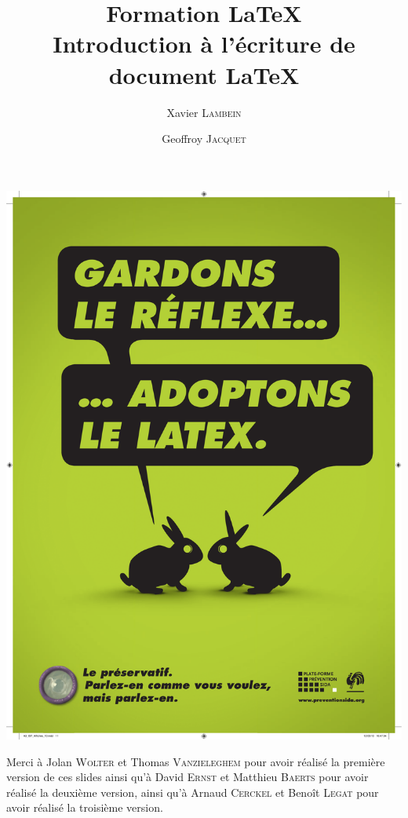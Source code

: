 \documentclass[10pt,svgnames,usenames,table]{beamer} %
\institute{Louvain-li-Nux}
\title{\textbf{Formation \LaTeX}\\
Introduction à l'écriture de document \textrm{\LaTeX}}
\author{Xavier \textsc{Lambein} \and Geoffroy \textsc{Jacquet}}
\begin{document}
\begin{landscape}
\begin{frame}
	\vspace{-.5cm}
	\hspace*{.1mm}
	\includegraphics[page=1,height=\paperwidth]{latex_sida.pdf}
\end{frame}
\end{landscape}

\begin{frame}
\maketitle
Merci à Jolan \textsc{Wolter} et Thomas \textsc{Vanzieleghem} pour avoir réalisé la première version de ces slides
ainsi qu'à David \textsc{Ernst} et Matthieu \textsc{Baerts} pour avoir réalisé la deuxième version, ainsi qu'à Arnaud \textsc{Cerckel} et Benoît \textsc{Legat} pour avoir réalisé la troisième version.
\end{frame}
\end{document}
